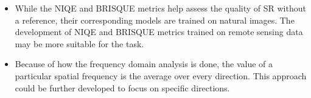 \begin{itemize}
    \item While the NIQE and BRISQUE metrics help assess the quality of SR without a reference, their corresponding models are trained on natural images. The development of NIQE and BRISQUE metrics trained on remote sensing data may be more suitable for the task.
    \item Because of how the frequency domain analysis is done, the value of a particular spatial frequency is the average over every direction. This approach could be further developed to focus on specific directions.
    
\end{itemize}